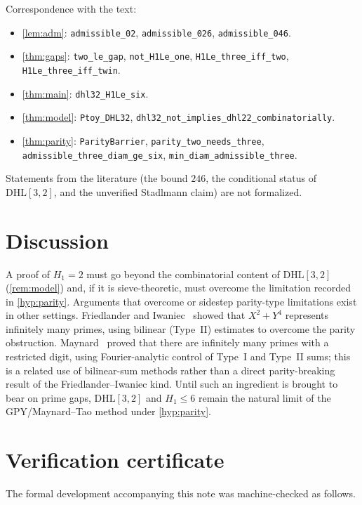 \documentclass[11pt]{amsart}
\theoremstyle{plain}
\theoremstyle{definition}
\theoremstyle{remark}
\newcommand{\DHL}{\mathrm{DHL}}
\begin{document}
{\raggedright
\noindent Correspondence with the text:
\begin{itemize}
\item \cref{lem:adm}: \texttt{admissible\_02}, \texttt{admissible\_026}, \texttt{admissible\_046}.
\item \cref{thm:gaps}: \texttt{two\_le\_gap}, \texttt{not\_H1Le\_one}, \texttt{H1Le\_three\_iff\_two}, \texttt{H1Le\_three\_iff\_twin}.
\item \cref{thm:main}: \texttt{dhl32\_H1Le\_six}.
\item \cref{thm:model}: \texttt{Ptoy\_DHL32}, \texttt{dhl32\_not\_implies\_dhl22\_combinatorially}.
\item \cref{thm:parity}: \texttt{ParityBarrier}, \texttt{parity\_two\_needs\_three}, \texttt{admissible\_three\_diam\_ge\_six}, \texttt{min\_diam\_admissible\_three}.
\end{itemize}\par}
Statements from the literature (the bound $246$, the conditional status of $\DHL[3,2]$, and the unverified Stadlmann claim) are not formalized.

\section{Discussion}\label{sec:discussion}

A proof of $H_1=2$ must go beyond the combinatorial content of $\DHL[3,2]$ (\cref{rem:model}) and, if it is sieve-theoretic, must overcome the limitation recorded in \cref{hyp:parity}. Arguments that overcome or sidestep parity-type limitations exist in other settings. Friedlander and Iwaniec~\cite{FI} showed that $X^2+Y^4$ represents infinitely many primes, using bilinear (Type~II) estimates to overcome the parity obstruction. Maynard~\cite{Maynard19} proved that there are infinitely many primes with a restricted digit, using Fourier-analytic control of Type~I and Type~II sums; this is a related use of bilinear-sum methods rather than a direct parity-breaking result of the Friedlander--Iwaniec kind. Until such an ingredient is brought to bear on prime gaps, $\DHL[3,2]$ and $H_1\le6$ remain the natural limit of the GPY/Maynard--Tao method under \cref{hyp:parity}.


\appendix
\section{Verification certificate}\label{app:cert}

The formal development accompanying this note was machine-checked as follows.
\end{document}
